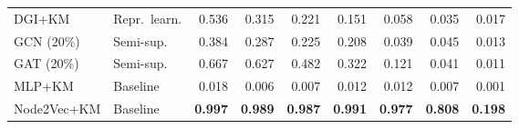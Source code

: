 \begin{table}[t]
\begin{tabular}{llrrrrrrr}
DGI+KM & Repr.\ learn. & 0.536 & 0.315 & 0.221 & 0.151 & 0.058 & 0.035 & 0.017 \\
GCN (20\%) & Semi-sup. & 0.384 & 0.287 & 0.225 & 0.208 & 0.039 & 0.045 & 0.013 \\
GAT (20\%) & Semi-sup. & 0.667 & 0.627 & 0.482 & 0.322 & 0.121 & 0.041 & 0.011 \\
MLP+KM & Baseline & 0.018 & 0.006 & 0.007 & 0.012 & 0.012 & 0.007 & 0.001 \\
Node2Vec+KM & Baseline & \textbf{0.997} & \textbf{0.989} & \textbf{0.987} & \textbf{0.991} & \textbf{0.977} & \textbf{0.808} & \textbf{0.198} \\
\bottomrule
\end{tabular}
\end{table}